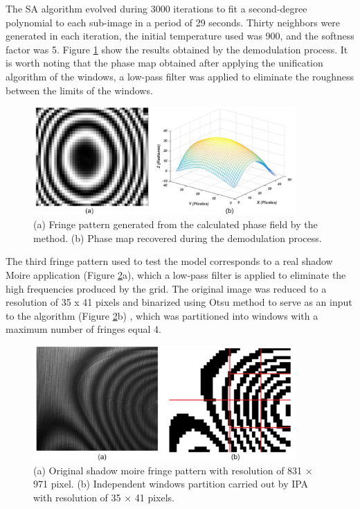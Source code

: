 \documentclass[review]{elsarticle}
\begin{document}
 The SA algorithm evolved during 3000 iterations to fit a second-degree polynomial to each sub-image in a period of 29 seconds. Thirty neighbors were generated in each iteration, the initial temperature used was 900, and the softness factor was 5.  Figure \ref{Fig9} show the results obtained by the demodulation process. It is worth noting that the phase map obtained after applying the unification algorithm of the windows, a low-pass filter was applied to eliminate the roughness between the limits of the windows.
  \begin{figure}[ht!]
\centering\includegraphics[width=10cm]{fig9}
\caption{(a) Fringe pattern generated from the calculated phase field by the method. (b) Phase map recovered during the demodulation process.}
\label{Fig9}
\end{figure}

The third fringe pattern used to test the model corresponds to a real shadow Moire application (Figure \ref{Fig10}a), which a low-pass filter is applied to eliminate the high frequencies produced by the grid. The original image was reduced to a resolution of 35 x 41 pixels and binarized using Otsu method to serve as an input to the algorithm (Figure \ref{Fig10}b) , which was partitioned into windows with a maximum number of fringes equal 4.
 
\begin{figure}[ht!]
\centering\includegraphics[width=10cm]{fig10}
\caption{(a) Original shadow moire fringe pattern with resolution of 831 $\times$ 971 pixel. (b) Independent windows partition carried out by IPA with resolution of 35 $\times$ 41 pixels.}
\label{Fig10}
\end{figure}
\end{document}
